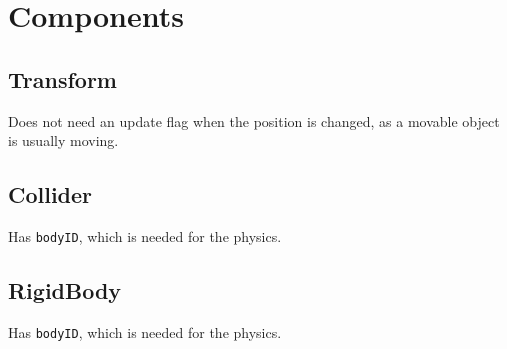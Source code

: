 \section{Components}

\subsection{Transform}
Does not need an update flag when the position is changed, as a movable object is usually moving.

\subsection{Collider}
Has \texttt{bodyID}, which is needed for the physics.

\subsection{RigidBody}
Has \texttt{bodyID}, which is needed for the physics.
